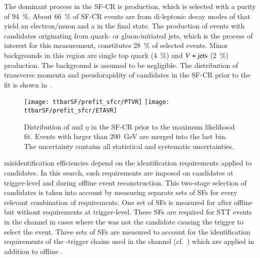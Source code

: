 The dominant process in the SF-CR is \ttbar production, which is selected with a
purity of \SI{94}{\percent}. About \SI{66}{\percent} of SF-CR events are from
di-leptonic decay modes of \ttbar that yield an electron/muon and a \tauhadvis
in the final state. The production of \ttbar events with \tauhadvis candidates
originating from quark- or gluon-initiated jets, which is the process of
interest for this measurement, constitutes \SI{28}{\percent} of selected
events. Minor backgrounds in this region are single top quark (\SI{4}{\percent})
and $V+\text{jets}$ (\SI{2}{\percent}) production. The \multijet background is assumed
to be negligible. The distribution of transverse momenta and pseudorapidity of
\tauhadvis candidates in the SF-CR prior to the fit is shown
in~.

\begin{figure}[htbp]
  \centering

  \texttt{[image: ttbarSF/prefit\_sfcr/PTVR]}%
  \texttt{[image: ttbarSF/prefit\_sfcr/ETAVR]}

  \caption{Distribution of \tauhadvis \pT and $\eta$ in the SF-CR prior to the
    maximum likelihood fit. Events with \tauhadvis \pT larger than
    \SI{200}{\GeV} are merged into the last bin. The uncertainty contains all
    statistical and systematic uncertainties.
  }%
  \label{fig:ttbarSF_prefit_pt}
\end{figure}

\Jettotauhadvis misidentification efficiencies depend on the identification
requirements applied to \tauhadvis candidates. In this search, such requirements
are imposed on \tauhadvis candidates at trigger-level and during offline event
reconstruction. This two-stage selection of \tauhadvis candidates is taken into
account by measuring separate sets of SFs for every relevant combination of
\tauid requirements. One set of SFs is measured for \faketauhadvis after offline
\tauid but without requirements at trigger-level. These SFs are required for STT
events in the \hadhad channel in cases where the \faketauhadvis was not the
candidate causing the trigger to select the event. Three sets of SFs are
measured to account for the identification requirements of the
\tauhadvis-trigger chains used in the \hadhad channel
(cf.~) which are applied in addition to
offline \tauid.

